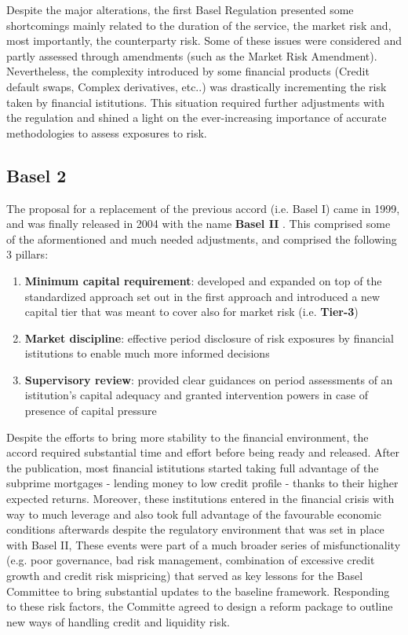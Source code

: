 \documentclass[a4paper,12pt]{article}
\begin{document}
    Despite the major alterations, the first Basel Regulation presented some shortcomings mainly related to the duration of the service, the market risk and, most importantly, the counterparty risk. Some of these issues were
    considered and partly assessed through amendments (such as the Market Risk Amendment). Nevertheless, the complexity introduced by some financial products (Credit default swaps, Complex derivatives, etc..) was drastically incrementing the risk taken by financial istitutions. 
    This situation required further adjustments with the regulation and shined a light on the ever-increasing importance of accurate methodologies to assess exposures to risk. 
     
    \subsection[]{Basel 2}
    The proposal for a replacement of the previous accord (i.e. Basel I) came in 1999, and was finally released in 2004 with the name \textbf{Basel II} .
    This comprised some of the aformentioned and much needed adjustments, and comprised the following 3 pillars:

        \begin{enumerate}
            \item \textbf{Minimum capital requirement}: developed and expanded on top of the standardized approach set out in the first approach and introduced a new capital tier that was meant to cover also for market risk (i.e. \textbf{Tier-3})
            \item \textbf{Market discipline}: effective period disclosure of risk exposures by financial istitutions to enable much more informed decisions
            \item \textbf{Supervisory review}: provided clear guidances on period assessments of an istitution's capital adequacy and granted intervention powers in case of presence of capital pressure 
        \end{enumerate}

    Despite the efforts to bring more stability to the financial environment, the accord required substantial time and effort before being ready and released. After the publication,
    most financial istitutions started taking full advantage of the subprime mortgages - lending money to low credit profile - thanks to their higher expected returns. Moreover, these institutions entered in the financial crisis 
    with way to much leverage and also took full advantage of the favourable economic conditions afterwards despite the regulatory environment that was set in place with Basel II,
    These events were part of a much broader series of misfunctionality (e.g. poor governance, bad risk management, combination of excessive credit growth and credit risk mispricing) 
    that served as key lessons for the Basel Committee to bring substantial updates to the baseline framework. Responding to these risk factors, the Committe agreed to design a reform
    package to outline new ways of handling credit and liquidity risk.
\end{document}
